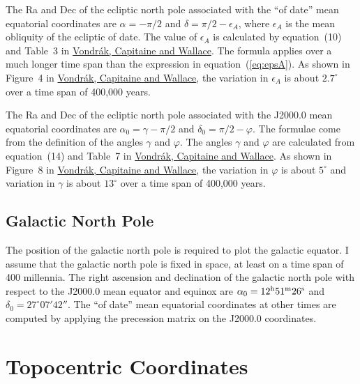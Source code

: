 \documentclass[12pt]{article}
\begin{document}
The Ra and Dec of the ecliptic north pole associated with the ``of date'' mean 
equatorial coordinates are $\alpha = -\pi/2$ and $\delta = \pi/2 - \epsilon_A$, 
where $\epsilon_A$ is the mean obliquity of the ecliptic of date. The value 
of $\epsilon_A$ is calculated by equation~(10) and Table~3 in 
\href{https://ui.adsabs.harvard.edu/abs/2011A%26A...534A..22V/abstract}{Vondr\'ak,
Capitaine and Wallace}. The formula applies over a much longer time span than the expression 
in equation~(\ref{eq:epsA}). As shown in Figure~4 in 
\href{https://ui.adsabs.harvard.edu/abs/2011A%26A...534A..22V/abstract}{Vondr\'ak,
Capitaine and Wallace}, the variation in $\epsilon_A$ is about $2.7^\circ$ 
over a time span of 400,000 years.

The Ra and Dec of the ecliptic north pole associated with the J2000.0 mean 
equatorial coordinates are $\alpha_0 = \gamma-\pi/2$ and $\delta_0=\pi/2 - \varphi$. 
The formulae come from the definition of the angles $\gamma$ and $\varphi$. 
The angles $\gamma$ and $\varphi$ are calculated from equation~(14) and Table~7 in 
\href{https://ui.adsabs.harvard.edu/abs/2011A%26A...534A..22V/abstract}{Vondr\'ak,
Capitaine and Wallace}. As shown in Figure~8 in 
\href{https://ui.adsabs.harvard.edu/abs/2011A%26A...534A..22V/abstract}{Vondr\'ak,
Capitaine and Wallace}, the variation in $\varphi$ is about $5^\circ$ and variation in 
$\gamma$ is about $13^\circ$ over a time span of 400,000 years.

\subsection{Galactic North Pole} 

The position of the galactic north pole is required to plot the galactic 
equator. I assume that the galactic north pole is fixed in space, at 
least on a time span of 400 millennia. The right ascension and declination 
of the galactic north pole with respect to the J2000.0 mean equator and equinox 
are $\alpha_0 = 12^{\rm h} 51^{\rm m} 26^{\rm s}$ and $\delta_0 = 27^\circ 07' 
42''$. The ``of date'' mean equatorial coordinates at other times are computed 
by applying the precession matrix on the J2000.0 coordinates.

\section{Topocentric Coordinates}
\end{document}
